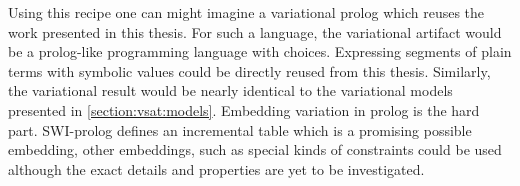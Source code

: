 Using this recipe one can might imagine a variational prolog which reuses the
work presented in this thesis. For such a language, the variational artifact
would be a prolog-like programming language with choices. Expressing segments of
plain terms with symbolic values could be directly reused from this thesis.
Similarly, the variational result would be nearly identical to the variational
models presented in \autoref{section:vsat:models}. Embedding variation in prolog
is the hard part. SWI-prolog defines an incremental table  which is a
promising possible embedding, other embeddings, such as special kinds of
constraints could be used although the exact details and properties are yet to
be investigated.

